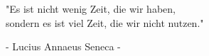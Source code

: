 \text{ }
\vspace{5cm}

\begin{center}\bfseries







"Es ist nicht wenig Zeit, die wir haben,\\sondern es ist viel Zeit, die wir nicht nutzen."

\mdseries

- Lucius Annaeus Seneca -



\end{center}
